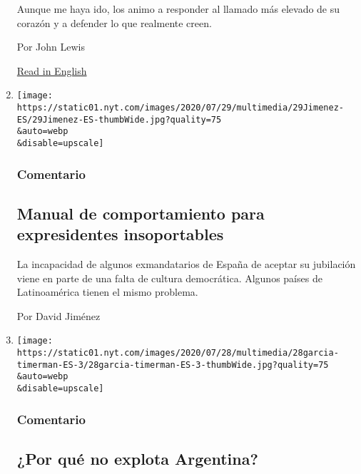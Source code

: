 \begin{enumerate}
  Aunque me haya ido, los animo a responder al llamado más elevado de su
  corazón y a defender lo que realmente creen.

  Por John Lewis

  \href{https://www.nytimes.com/2020/07/30/opinion/john-lewis-civil-rights-america.html}{Read
  in English}
\item
  \href{/es/2020/07/29/espanol/opinion/espana-felipe-gonzalez-jose-maria-aznar.html}{}

  \texttt{[image: https://static01.nyt.com/images/2020/07/29/multimedia/29Jimenez-ES/29Jimenez-ES-thumbWide.jpg?quality=75\\\&auto=webp\\\&disable=upscale]}

  \hypertarget{comentario-9}{%
  \subsubsection{Comentario}\label{comentario-9}}

  \hypertarget{manual-de-comportamiento-para-expresidentes-insoportables}{%
  \subsection{Manual de comportamiento para expresidentes
  insoportables}\label{manual-de-comportamiento-para-expresidentes-insoportables}}

  La incapacidad de algunos exmandatarios de España de aceptar su
  jubilación viene en parte de una falta de cultura democrática. Algunos
  países de Latinoamérica tienen el mismo problema.

  Por David Jiménez
\item
  \href{/es/2020/07/28/espanol/opinion/argentina-estallido-2001-coronavirus.html}{}

  \texttt{[image: https://static01.nyt.com/images/2020/07/28/multimedia/28garcia-timerman-ES-3/28garcia-timerman-ES-3-thumbWide.jpg?quality=75\\\&auto=webp\\\&disable=upscale]}

  \hypertarget{comentario-10}{%
  \subsubsection{Comentario}\label{comentario-10}}

  \hypertarget{por-quuxe9-no-explota-argentina}{%
  \subsection{¿Por qué no explota
  Argentina?}\label{por-quuxe9-no-explota-argentina}}


\end{enumerate}
